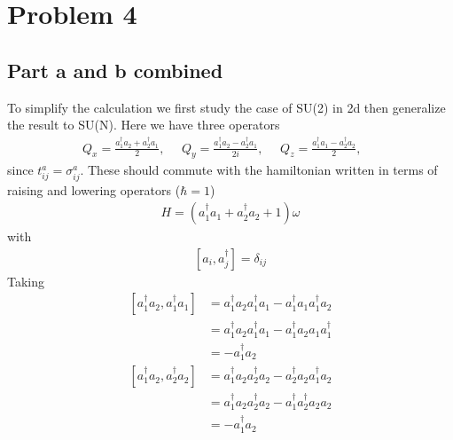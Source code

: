 \documentclass[a4paper,12pt]{article}
\begin{document}
\section*{Problem 4}
\subsection*{Part a and b combined}
To simplify the calculation we first study the case of SU(2) in 2d then generalize the result to SU(N). Here we have three operators
\begin{equation}
	\begin{aligned}
		Q_x=\frac{a_1^\dagger a_2+a_2^\dagger a_1}{2},~~~~~~
		Q_y=\frac{a_1^\dagger a_2-a_2^\dagger a_1}{2i},~~~~~~
		Q_z=\frac{a_1^\dagger a_1-a_2^\dagger a_2}{2},~~~~~~
	\end{aligned}
\end{equation}
since $t^a_{ij}=\sigma_{ij}^a$. These should commute with the hamiltonian written in terms of raising and lowering operators ($\hbar=1$)
\begin{equation}
	\begin{aligned}
		H=(a_1^\dagger a_1+a_2^\dagger a_2+1)\omega 
	\end{aligned}
\end{equation}
with 
\begin{equation}
	\begin{aligned}
		\left[a_i,a^\dagger_j\right]=\delta_{ij}
	\end{aligned}
\end{equation}
Taking
\begin{equation}
	\begin{aligned}
		\left[a_1^\dagger a_2,a_1^\dagger a_1\right]&=a_1^\dagger a_2a_1^\dagger a_1-a_1^\dagger a_1a_1^\dagger a_2\\
		&=a_1^\dagger a_2a_1^\dagger a_1-a_1^\dagger a_2 a_1a_1^\dagger \\
		&=-a_1^\dagger a_2 
	\end{aligned}
\end{equation}
\begin{equation}
	\begin{aligned}
		\left[a_1^\dagger a_2,a_2^\dagger a_2\right]&=a_1^\dagger a_2a_2^\dagger a_2-a_2^\dagger a_2a_1^\dagger a_2\\
		&=a_1^\dagger a_2a_2^\dagger a_2-a_1^\dagger a_2^\dagger a_2 a_2\\
		&=-a_1^\dagger a_2	\end{aligned}
\end{equation}
\end{document}
